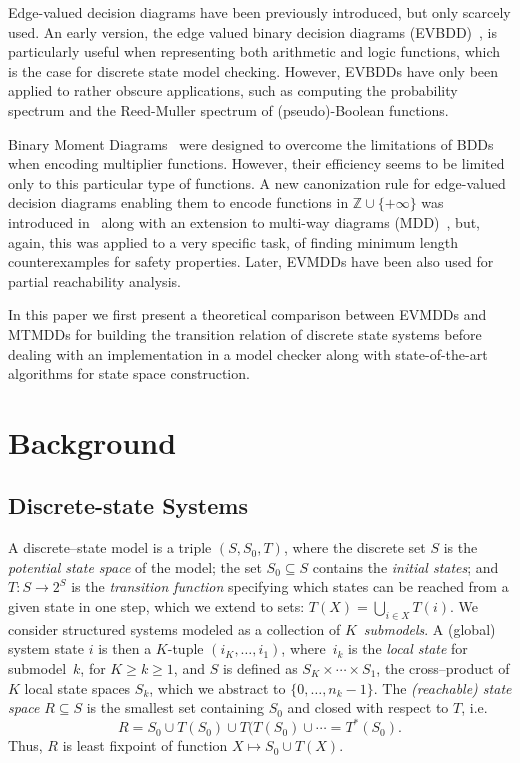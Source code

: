 \documentclass[a4paper,oneside,11pt,pdftex]{llncs}
\newcommand{\Z}{\mathbb{Z}}
\begin{document}
Edge-valued decision diagrams have been previously introduced, but only 
scarcely used. An early version, the edge valued binary decision 
diagrams (EVBDD)~\cite{Lai1992,Lai1996}, is particularly useful when 
representing both arithmetic and logic functions, which is the case for 
discrete state model checking. However, EVBDDs have only been applied to 
rather obscure applications, such as computing the probability spectrum 
and the Reed-Muller spectrum of (pseudo)-Boolean functions.

Binary Moment Diagrams~\cite{Bryant1994} were designed to overcome the 
limitations of BDDs when encoding multiplier functions. However, their 
efficiency seems to be limited only to this particular type of functions.
%
A new canonization rule for edge-valued decision diagrams enabling them 
to encode functions in $\Z \cup \{+\infty\}$ was introduced 
in~\cite{FMCAD2002} along with an extension to multi-way diagrams 
(MDD)~\cite{Kam1998}, but, again, this was applied to a very specific 
task, of finding minimum length counterexamples for safety properties. 
Later, EVMDDs have been also used for partial reachability analysis.

In this paper we first present a theoretical comparison between EVMDDs 
and MTMDDs for building the transition relation of discrete state 
systems before dealing with an implementation in a model checker along 
with state-of-the-art algorithms for state space construction.

\section{Background}

\subsection{Discrete-state Systems}\label{sec:DSS}

A discrete--state model is a triple $(S,S_0,T)$, where
the discrete set $S$ is the \emph{potential state space} of the model;
the set $S_0\subseteq S$ contains the \emph{initial states};
and $T : S\rightarrow 2^{S}$ is the \emph{transition function}
specifying which states can be reached from a given state in one step, 
which we extend to sets: $T(X) = \bigcup_{i\in X}T(i)$.
We consider structured systems modeled as a collection of $K$~\emph{submodels}.
A (global) system state $i$ is then a $K$-tuple $(i_{K},\ldots,i_{1})$,
where~$i_{k}$ is the \emph{local state} for submodel~$k$,
for $K \!\geq\! k\! \geq\! 1$, and
$S$ is defined as $ S_K \times \cdots \times  S_{1}$,
the cross--product of $K$ local state spaces $ S_k$,
which we abstract to $\{0,\ldots,n_k\!-\!1\}$.
The \emph{(reachable) state space} $R \subseteq S$ is the
smallest set containing $S_0$ and closed with respect to $T$,
i.e.
$$R = S_0 \cup T(S_0) \cup
T(T(S_0) \cup \cdots = T^{\ast}(S_0).$$
Thus, $R$ is least fixpoint of function $X \mapsto S_0 \cup T(X)$.
\end{document}
